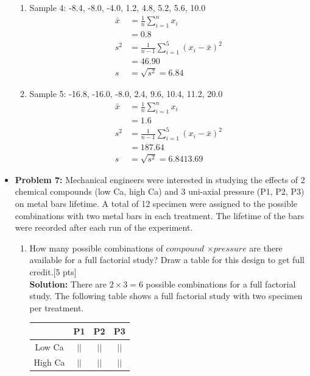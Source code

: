 \documentclass[11pt]{article}\usepackage[]{graphicx}\usepackage[]{color}
\begin{document}
\begin{itemize}
\begin{enumerate}
	\item Sample 4: -8.4, -8.0, -4.0, 1.2, 4.8, 5.2, 5.6, 10.0\\
    \begin{align*}
	\bar{x} &= \frac{1}{n}\sum_{i=1}^{n}x_i\\
			&=  0.8\\
			s^2 &= \frac{1}{n-1}\sum_{i=1}^5 (x_i - \bar{x})^2 \\
			&= 46.90\\
			s&= \sqrt{s^2}= 6.84
	\end{align*}
		
	\item Sample 5: -16.8, -16.0, -8.0, 2.4, 9.6, 10.4, 11.2, 20.0\\
	\begin{align*}
			\bar{x} &= \frac{1}{n}\sum_{i=1}^{n}x_i\\
			&=  1.6\\
			s^2 &= \frac{1}{n-1}\sum_{i=1}^5 (x_i - \bar{x})^2 \\
			&= 187.64\\
			s&= \sqrt{s^2}= 6.8413.69
	\end{align*}			
\end{enumerate}



\item \textbf{Problem 7:} Mechanical engineers were interested in studying the effects of 2 chemical compounds 
	(low Ca, high Ca) and 3 uni-axial pressure (P1, P2, P3) on metal bars lifetime. A total of 12 specimen were assigned to the possible combinations with two metal bars in each treatment. The lifetime of the bars were recorded after each run of the experiment. 
\begin{enumerate}
	\item How many possible combinations of $compound$ $\times{ pressure}$ are there available for a full factorial study? Draw a table for this design to get full credit.[5 pts]\\
	\textbf{Solution:} There are $2\times{3} = 6$ possible combinations for a full factorial study. The following table shows a full factorial study with two specimen per treatment.
	\begin{center}
			\begin{tabular}{|c|c|c|c|}
				\hline
				& P1 & P2 &P3\\
				\hline
				Low Ca & $||$ &$||$ &$||$ \\
				\hline
				High Ca &$||$ &$||$ & $||$\\
				\hline
			\end{tabular}
	\end{center}
	

\end{enumerate}
\end{itemize}
\end{document}
